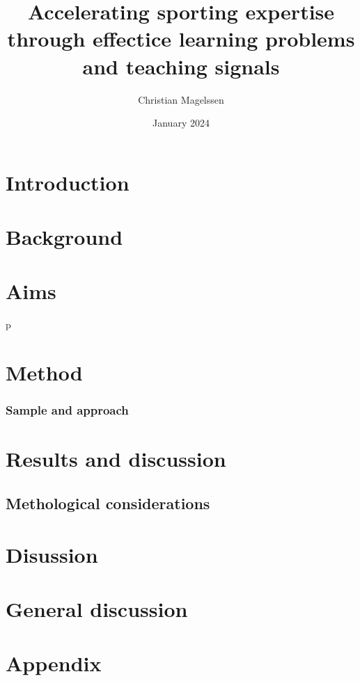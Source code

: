 \documentclass{report}
\title{Accelerating sporting expertise through effectice learning problems and teaching signals}
\author{Christian Magelssen}
\date{January 2024}
\begin{document}
\maketitle

\listoffigures

\chapter{Introduction}


\chapter{Background}


\chapter{Aims}



p
\chapter{Method}



\subsection{Sample and approach}


\chapter{Results and discussion}



\section{Methological considerations}


\chapter{Disussion}




\chapter{General discussion}


\chapter{Appendix}


\printbibliography
\end{document}
